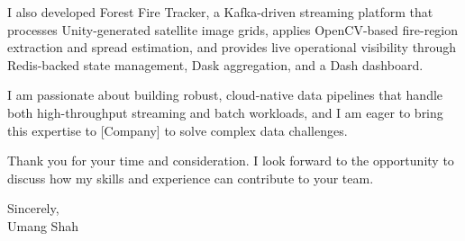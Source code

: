 \documentclass[11pt]{article}
\begin{document}
I also developed Forest Fire Tracker, a Kafka-driven streaming platform that processes Unity-generated satellite image grids, applies OpenCV-based fire-region extraction and spread estimation, and provides live operational visibility through Redis-backed state management, Dask aggregation, and a Dash dashboard.

I am passionate about building robust, cloud-native data pipelines that handle both high-throughput streaming and batch workloads, and I am eager to bring this expertise to [Company] to solve complex data challenges.

Thank you for your time and consideration. I look forward to the opportunity to discuss how my skills and experience can contribute to your team.

Sincerely,\\
Umang Shah
\end{document}
